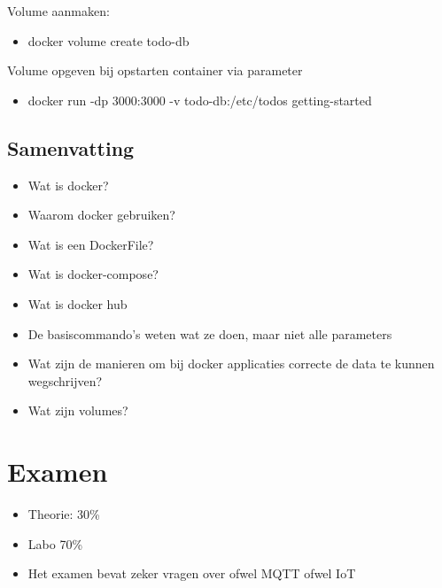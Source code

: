 \documentclass{article}
\begin{document}
Volume aanmaken:
 
\begin{itemize}
    \item docker volume create todo-db
\end{itemize}

Volume opgeven bij opstarten container via parameter

\begin{itemize}
    \item docker run -dp 3000:3000 -v todo-db:/etc/todos getting-started
\end{itemize}

\subsection{Samenvatting}

\begin{itemize}
    \item Wat is docker?
    \item Waarom docker gebruiken?
    \item Wat is een DockerFile?
    \item Wat is docker-compose?
    \item Wat is docker hub
    \item De basiscommando’s weten wat ze doen, maar niet alle parameters
    \item Wat zijn de manieren om bij docker applicaties correcte de data te kunnen wegschrijven?
    \item Wat zijn volumes?
\end{itemize}

\section{Examen}
\begin{itemize}
    \item Theorie: 30\%
    \item Labo 70\%
    \item Het examen bevat zeker vragen over ofwel MQTT ofwel IoT
\end{itemize}
\end{document}
